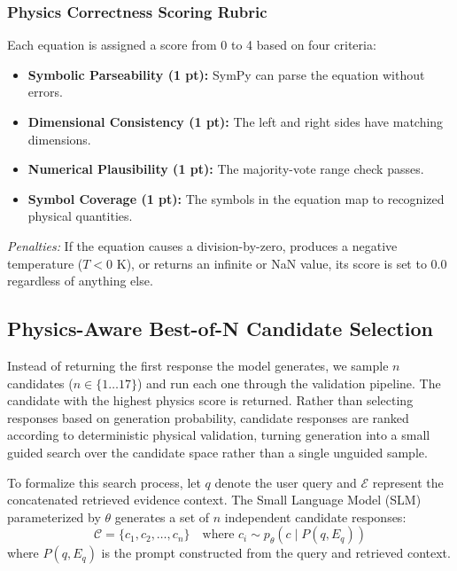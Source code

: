 \documentclass[a4paper,fleqn]{cas-sc}
\begin{document}
\subsubsection{Physics Correctness Scoring Rubric}
Each equation is assigned a score from 0 to 4 based on four criteria:
\begin{itemize}
    \item \textbf{Symbolic Parseability (1 pt):} SymPy can parse the equation without errors.
    \item \textbf{Dimensional Consistency (1 pt):} The left and right sides have matching dimensions.
    \item \textbf{Numerical Plausibility (1 pt):} The majority-vote range check passes.
    \item \textbf{Symbol Coverage (1 pt):} The symbols in the equation map to recognized physical quantities.
\end{itemize}
\textit{Penalties:} If the equation causes a division-by-zero, produces a negative temperature ($T < 0$ K), or returns an infinite or NaN value, its score is set to 0.0 regardless of anything else.

\subsection{Physics-Aware Best-of-N Candidate Selection}
\label{subsec:selection}
Instead of returning the first response the model generates, we sample $n$ candidates ($n \in \{1 \dots 17\}$) and run each one through the validation pipeline. The candidate with the highest physics score is returned. Rather than selecting responses based on generation probability, candidate responses are ranked according to deterministic physical validation, turning generation into a small guided search over the candidate space rather than a single unguided sample.

To formalize this search process, let $q$ denote the user query and $\mathcal{E}$ represent the concatenated retrieved evidence context. The Small Language Model (SLM) parameterized by $\theta$ generates a set of $n$ independent candidate responses:
\begin{equation*}
\mathcal{C} = \{c_1, c_2, \dots, c_n\} \quad \text{where } c_i \sim p_{\theta}(c \mid P(q, E_q))
\end{equation*}
where $P(q, E_q)$ is the prompt constructed from the query and retrieved context.
\end{document}
